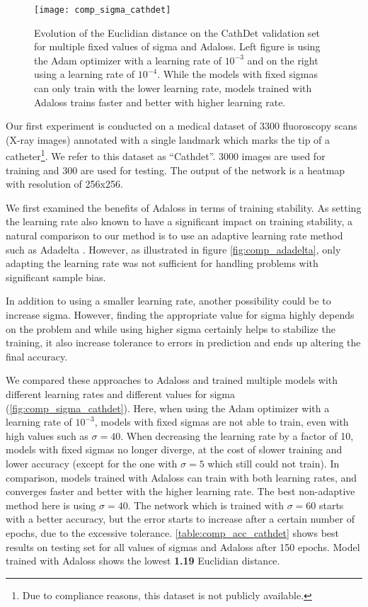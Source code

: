 \documentclass[10pt,twocolumn,letterpaper]{article}
\begin{document}
\begin{figure*}[ht]
  \begin{center}
    \centering
	\texttt{[image: comp\_sigma\_cathdet]}
	\caption{Evolution of the Euclidian distance on the
          CathDet validation set for multiple fixed values of sigma
          and Adaloss. Left figure is using the Adam optimizer with a learning
          rate of $10^{-3}$ and on the right using a learning rate of $10^{-4}$.
          While the models with fixed sigmas can only train with the lower
          learning rate, models trained with Adaloss trains faster and better
          with higher learning rate.}
	\label{fig:comp_sigma_cathdet}
  \end{center}
\end{figure*}

Our first experiment is conducted on a medical dataset of 3300
fluoroscopy scans (X-ray images) annotated with a single landmark
which marks the tip of a catheter\footnote{Due to compliance reasons, this
dataset is not publicly available.}. We refer to this dataset as ``Cathdet''.
3000 images are used for training and 300 are used for testing. The output of the network
is a heatmap with resolution of 256x256.



We first examined the benefits of Adaloss in terms of training stability. As setting the learning rate
also known to have a significant impact on training stability, a natural
comparison to our method is to use an adaptive learning rate method such as Adadelta
\cite{adadelta}. However, as illustrated in figure \autoref{fig:comp_adadelta}, only adapting the learning rate was not sufficient for handling problems with significant sample bias. 

In addition to using a smaller
learning rate, another possibility could be to increase
sigma. However, finding the appropriate value for sigma highly depends
on the problem and while using higher sigma certainly helps to stabilize the
training, it also increase tolerance to errors in prediction and ends
up altering the final accuracy.

We compared these approaches to Adaloss and trained multiple models
with different learning rates and different values for sigma
(\autoref{fig:comp_sigma_cathdet}). Here, when using the Adam
optimizer with a learning rate of $10^{-3}$, models with fixed sigmas
are not able to train, even with high values such as $\sigma=40$.
When decreasing the learning rate by a factor of 10, models with fixed
sigmas no longer diverge, at the cost of slower training and lower
accuracy (except for the one with $\sigma=5$ which still could not
train). In comparison, models trained with Adaloss can train with both
learning rates, and converges faster and better with the higher
learning rate. The best non-adaptive method here is using
$\sigma=40$. The network which is trained with $\sigma=60$ starts
with a better accuracy, but the error starts to increase after a certain
number of epochs, due to the excessive tolerance.
\autoref{table:comp_acc_cathdet} shows best results on testing set for
all values of sigmas and Adaloss after 150 epochs. Model trained with
Adaloss shows the lowest \textbf{1.19} Euclidian distance.
\end{document}
